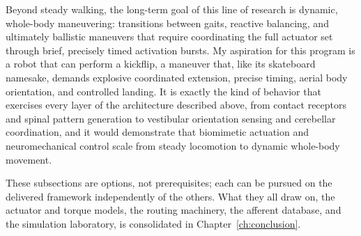 Beyond steady walking, the long-term goal of this line of research is dynamic, whole-body maneuvering: transitions between gaits, reactive balancing, and ultimately ballistic maneuvers that require coordinating the full actuator set through brief, precisely timed activation bursts. My aspiration for this program is a robot that can perform a kickflip, a maneuver that, like its skateboard namesake, demands explosive coordinated extension, precise timing, aerial body orientation, and controlled landing. It is exactly the kind of behavior that exercises every layer of the architecture described above, from contact receptors and spinal pattern generation to vestibular orientation sensing and cerebellar coordination, and it would demonstrate that biomimetic actuation and neuromechanical control scale from steady locomotion to dynamic whole-body movement.

These subsections are options, not prerequisites; each can be pursued on the delivered framework independently of the others. What they all draw on, the actuator and torque models, the routing machinery, the afferent database, and the simulation laboratory, is consolidated in Chapter~\ref{ch:conclusion}.

